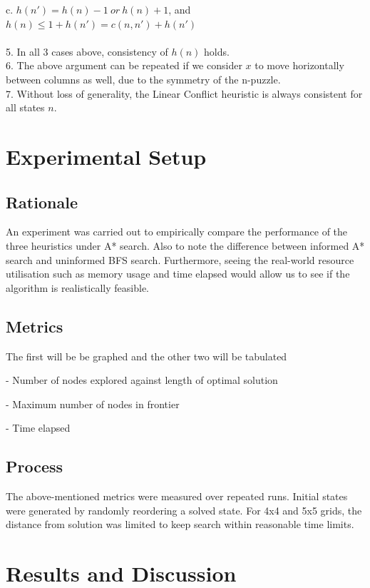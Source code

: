 \documentclass[runningheads]{llncs}
\begin{document}
\indent c. $h(n') = h(n) - 1 \ or \  h(n) + 1$, and $h(n) \leq 1 + h(n') = c(n, n') + h(n')$\\
\\
5. In all 3 cases above, consistency of $h(n)$ holds.\\ 
6. The above argument can be repeated if we consider $x$ to move horizontally between columns as well, due to the symmetry of the n-puzzle.\\ 
7. Without loss of generality, the Linear Conflict heuristic is always consistent for all states $n$.\\ 
 
\section{Experimental Setup}

\subsection{Rationale}
An experiment was carried out to empirically compare the performance of the three heuristics under A* search. Also to note the difference between informed A* search and uninformed BFS search. Furthermore, seeing the real-world resource utilisation such as memory usage and time elapsed would allow us to see if the algorithm is realistically feasible. 

\subsection{Metrics} The first will be be graphed and the other two will be tabulated

- Number of nodes explored against length of optimal solution

- Maximum number of nodes in frontier

- Time elapsed

\subsection{Process}
The above-mentioned metrics were measured over repeated runs. Initial states were generated by randomly reordering a solved state. For 4x4 and 5x5 grids, the distance from solution was limited to keep search within reasonable time limits.



\section{Results and Discussion}
\end{document}
